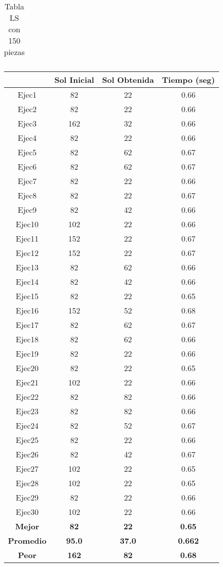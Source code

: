 \begin{center}
\begin{table}
\begin{tabular}{|c|c|c|c|}
\end{tabular}
\caption{Tabla LS con 150 piezas}
\end{table}

\begin{table}

\begin{tabular}{|c|c|c|c|}

\hline
 & {\bf Sol Inicial} & {\bf Sol Obtenida} & {\bf Tiempo (seg)} \\
\hline
Ejec1 & 82 & 22  & 0.66 \\
\hline
Ejec2 & 82 & 22  & 0.66 \\
\hline
Ejec3 & 162 & 32  & 0.66 \\
\hline
Ejec4 & 82 & 22  & 0.66 \\
\hline
Ejec5 & 82 & 62  & 0.67 \\
\hline
Ejec6 & 82 & 62  & 0.67 \\
\hline
Ejec7 & 82 & 22  & 0.66 \\
\hline
Ejec8 & 82 & 22  & 0.67 \\
\hline
Ejec9 & 82 & 42  & 0.66 \\
\hline
Ejec10 & 102 & 22  & 0.66 \\
\hline
Ejec11 & 152 & 22  & 0.67 \\
\hline
Ejec12 & 152 & 22  & 0.67 \\
\hline
Ejec13 & 82 & 62  & 0.66 \\
\hline
Ejec14 & 82 & 42  & 0.66 \\
\hline
Ejec15 & 82 & 22  & 0.65 \\
\hline
Ejec16 & 152 & 52  & 0.68 \\
\hline
Ejec17 & 82 & 62  & 0.67 \\
\hline
Ejec18 & 82 & 62  & 0.66 \\
\hline
Ejec19 & 82 & 22  & 0.66 \\
\hline
Ejec20 & 82 & 22  & 0.65 \\
\hline
Ejec21 & 102 & 22  & 0.66 \\
\hline
Ejec22 & 82 & 82  & 0.66 \\
\hline
Ejec23 & 82 & 82  & 0.66 \\
\hline
Ejec24 & 82 & 52  & 0.67 \\
\hline
Ejec25 & 82 & 22  & 0.66 \\
\hline
Ejec26 & 82 & 42  & 0.67 \\
\hline
Ejec27 & 102 & 22  & 0.65 \\
\hline
Ejec28 & 102 & 22  & 0.65 \\
\hline
Ejec29 & 82 & 22  & 0.66 \\
\hline
Ejec30 & 102 & 22  & 0.66 \\
\hline
{\bf Mejor} & {\bf 82} & {\bf 22} & {\bf 0.65} \\
\hline
{\bf Promedio} & {\bf 95.0} & {\bf 37.0} & {\bf 0.662} \\
\hline
{\bf Peor} & {\bf 162} & {\bf 82} & {\bf 0.68} \\
\hline


\end{tabular}
\end{table}
\end{center}
